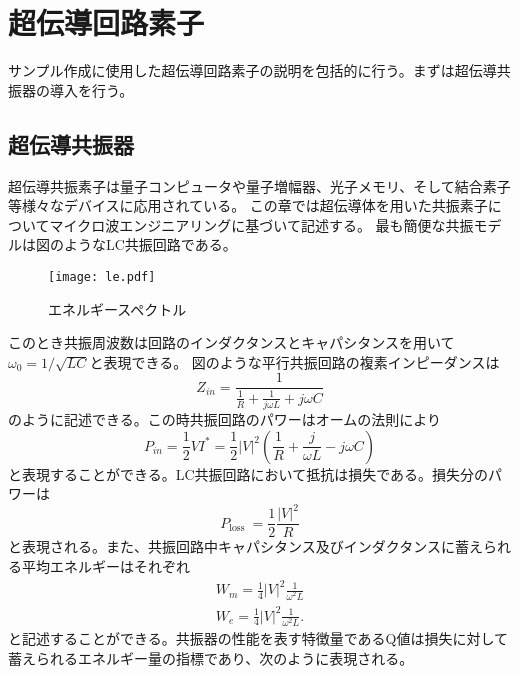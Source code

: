 \section{超伝導回路素子}
    サンプル作成に使用した超伝導回路素子の説明を包括的に行う。まずは超伝導共振器の導入を行う。
    \subsection{超伝導共振器}
    超伝導共振素子は量子コンピュータ\cite*{Goppl2008}や量子増幅器、光子メモリ\cite*{Pierre2014}、そして結合素子\cite*{Baust2015,Reuther2009}等様々なデバイスに応用されている。
        この章では超伝導体を用いた共振素子についてマイクロ波エンジニアリングに基づいて記述する。\cite*{Microwave}
        最も簡便な共振モデルは図のようなLC共振回路である。
        \begin{figure}[H]
            \centering
            \texttt{[image: le.pdf]}
            \caption{エネルギースペクトル}
        \end{figure}
        このとき共振周波数は回路のインダクタンスとキャパシタンスを用いて$\omega_0=1/\sqrt{LC}$と表現できる。
        図のような平行共振回路の複素インピーダンスは
        \begin{equation}
            Z_{i n}=\frac{1}{\frac{1}{R}+\frac{1}{j \omega L}+j \omega C}
        \end{equation}
        のように記述できる。この時共振回路のパワーはオームの法則により
        \begin{equation}
            P_{i n}=\frac{1}{2} V I^{*}=\frac{1}{2}|V|^{2}\left(\frac{1}{R}+\frac{j}{\omega L}-j \omega C\right)
            \end{equation}
        と表現することができる。LC共振回路において抵抗は損失である。損失分のパワーは
        \begin{equation}
            P_{\text {loss }}=\frac{1}{2} \frac{|V|^{2}}{R}
        \end{equation}
        と表現される。また、共振回路中キャパシタンス及びインダクタンスに蓄えられる平均エネルギーはそれぞれ
        \begin{equation}
            \begin{array}{l}
            W_{m}=\frac{1}{4}|V|^{2} \frac{1}{\omega^{2} L} \\
            W_{e}=\frac{1}{4}|V|^{2} \frac{1}{\omega^{2} L} .
            \end{array}
            \end{equation}
        と記述することができる。共振器の性能を表す特徴量であるQ値は損失に対して蓄えられるエネルギー量の指標であり、次のように表現される。

